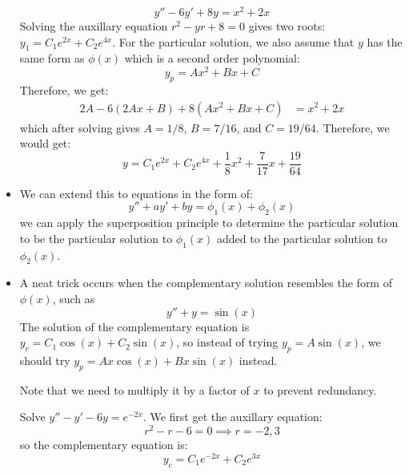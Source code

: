 \begin{itemize}
    \begin{equation}
        y''-6y' +8y = x^2+2x
        \label{eq:}
    \end{equation}
    Solving the auxillary equation $r^2-yr+8=0$ gives two roots: $y_1=C_1e^{2x}+C_2e^{4x}$. For the particular solution, we also assume that $y$ has the same form as $\phi(x)$ which is a second order polynomial:
    \begin{equation}
        y_p = Ax^2+Bx+C
        \label{eq:}
    \end{equation}
    Therefore, we get:
    \begin{align}
        2A-6(2Ax+B)+8(Ax^2+Bx+C)&=x^2+2x
    \end{align}
    which after solving gives $A=1/8$, $B=7/16$, and $C=19/64$. Therefore, we would get:
    \begin{equation}
        y = C_1e^{2x}+C_2e^{4x}+\frac{1}{8}x^2+\frac{7}{17}x+\frac{19}{64}
        \label{eq:}
    \end{equation}
    \item We can extend this to equations in the form of:
    \begin{equation}
        y''+ay'+by = \phi_1(x)+\phi_2(x)
        \label{eq:}
    \end{equation}
    we can apply the superposition principle to determine the particular solution to be the particular solution to $\phi_1(x)$ added to the particular solution to $\phi_2(x)$.
    \item A neat trick occurs when the complementary solution resembles the form of $\phi(x)$, such as
    \begin{equation}
        y''+y=\sin(x)
        \label{eq:}
    \end{equation}
    The solution of the complementary equation is $y_c=C_1\cos(x)+C_2\sin(x)$, so instead of trying $y_p=A\sin(x)$, we should try $y_p=Ax\cos(x)+Bx\sin(x)$ instead.
    \begin{warning}
        Note that we need to multiply it by a factor of $x$ to prevent redundancy.
    \end{warning}
    \begin{example}
        Solve $y''-y'-6y=e^{-2x}$. We first get the auxillary equation:
        \begin{equation}
            r^2-r-6=0 \implies r = -2,3
            \label{eq:}
        \end{equation}
        so the complementary equation is:
        \begin{equation}
            y_c = C_1e^{-2x}+C_2e^{3x}

\end{equation}
\end{example}
\end{itemize}
